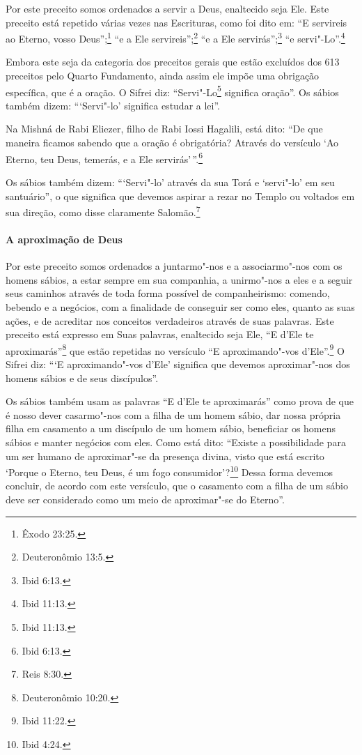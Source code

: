\begin{multicols}{2}
Por este preceito somos ordenados a servir a Deus, enaltecido seja Ele.
Este preceito está repetido várias vezes nas Escrituras, como foi dito
em: ``E servireis ao Eterno, vosso Deus'';\footnote{Êxodo 23:25.} ``e a Ele
servireis'';\footnote{Deuteronômio 13:5.} ``e a Ele servirás'';\footnote{Ibid 6:13.} ``e servi"-Lo''.\footnote{Ibid 11:13.}

Embora este seja da categoria dos preceitos gerais que estão excluídos dos 613 preceitos pelo Quarto Fundamento, ainda assim ele impõe uma obrigação
específica, que é a oração. O Sifrei\starr{} diz: ``Servi"-Lo\footnote{Ibid 11:13.}
significa oração''. Os sábios também dizem: ```Servi"-lo' significa
estudar a lei''.

Na Mishná\starr{} de Rabi Eliezer\starr, filho de Rabi Iossi Hagalili\starr, está dito:
``De que maneira ficamos sabendo que a oração é obrigatória? Através do
versículo `Ao Eterno, teu Deus, temerás, e a Ele servirás'\,''.\footnote{Ibid
6:13.}

Os sábios também dizem: ```Servi"-lo' através da sua Torá\starr{} e
`servi"-lo' em seu santuário'', o que significa que devemos aspirar a
rezar no Templo ou voltados em sua direção, como disse claramente
Salomão.\footnote{Reis 8:30.}

\paragraph{A aproximação de Deus}

Por este preceito somos ordenados a juntarmo"-nos e a associarmo"-nos com
os homens sábios, a estar sempre em sua companhia, a unirmo"-nos a eles e
a seguir seus caminhos através de toda forma possível de
companheirismo: comendo, bebendo e a negócios, com a finalidade de
conseguir ser como eles, quanto as suas ações, e de acreditar nos
conceitos verdadeiros através de suas palavras. Este preceito está
expresso em Suas palavras, enaltecido seja Ele, ``E d'Ele te
aproximarás''\footnote{Deuteronômio 10:20.} que estão 
repetidas no versículo ``E aproximando"-vos d'Ele''.\footnote{Ibid 11:22.}
O Sifrei\starr{} diz: ```E aproximando"-vos d'Ele' significa que devemos aproximar"-nos dos homens sábios e de seus discípulos''.

Os sábios também usam as palavras ``E d'Ele te aproximarás'' como prova
de que é nosso dever casarmo"-nos com a filha de um homem sábio, dar
nossa própria filha em casamento a um discípulo de um homem sábio,
beneficiar os homens sábios e manter negócios com eles. Como está dito:
``Existe a possibilidade para um ser humano de aproximar"-se da presença
divina, visto que está escrito `Porque o Eterno, teu Deus, é um fogo
consumidor'?\footnote{Ibid 4:24.} Dessa forma devemos concluir, de acordo com
este versículo, que o casamento com a filha de um sábio deve ser
considerado como um meio de aproximar"-se do Eterno''.


\end{multicols}

